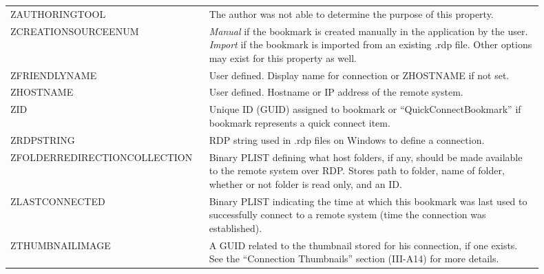\documentclass[journal]{IEEEtran}
\begin{document}
\begin{table}[h!]
\begin{tabular}{p{0.3\linewidth} | p{0.6\linewidth}}
ZAUTHORINGTOOL                & The author was not able to determine the purpose of this property. \\
ZCREATIONSOURCEENUM           & \textit{Manual} if the bookmark is created manually in the application by the user. \textit{Import} if the bookmark is imported from an existing .rdp file. Other options may exist for this property as well.                                                                                                                                                                                           \\
ZFRIENDLYNAME                 & User defined. Display name for connection or ZHOSTNAME if not set.                                                                                                                                                                                           \\
ZHOSTNAME                     & User defined. Hostname or IP address of the remote system.                                                                                                                                                                                           \\
ZID                           & Unique ID (GUID) assigned to bookmark or “QuickConnectBookmark” if bookmark represents a quick connect item.                                                                                   \\
ZRDPSTRING                    & RDP string used in .rdp files on Windows to define a connection.                                                                                                                               \\
ZFOLDERREDIRECTIONCOLLECTION  & Binary PLIST defining what host folders, if any, should be made available to the remote system over RDP. Stores path to folder, name of folder, whether or not folder is read only, and an ID. \\
ZLASTCONNECTED                & Binary PLIST indicating the time at which this bookmark was last used to successfully connect to a remote system (time the connection was established).                                                                                           \\
ZTHUMBNAILIMAGE               & A GUID related to the thumbnail stored for his connection, if one exists. See the “Connection Thumbnails” section (III-A14) for more details.                                                                                                                                                                                         
\end{tabular}
\end{table}
\end{document}
